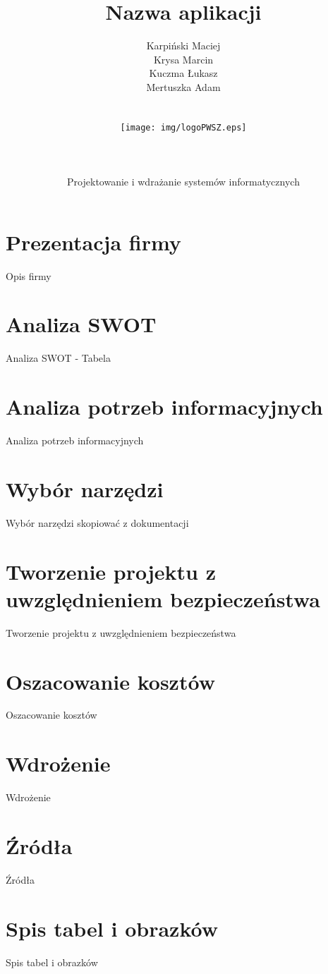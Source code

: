 \documentclass[12pt,a4paper]{article}
\author{Karpiński Maciej\\Krysa Marcin\\Kuczma Łukasz\\Mertuszka Adam\\\\\\\texttt{[image: img/logoPWSZ.eps]}\\\\\\\\Projektowanie i wdrażanie systemów informatycznych}
\title{Nazwa aplikacji}
\begin{document}
	\maketitle
	\thispagestyle{empty}
	\clearpage

	\tableofcontents
	\newpage

	\section{Prezentacja firmy}
		\indent Opis firmy
	\newpage

	\section{Analiza SWOT}
		\indent Analiza SWOT - Tabela
	\newpage
	
	\section{Analiza potrzeb informacyjnych}
		\indent Analiza potrzeb informacyjnych
	\newpage
	
	\section{Wybór narzędzi}
		\indent Wybór narzędzi skopiować z dokumentacji
	\newpage
	
	\section{Tworzenie projektu z uwzględnieniem bezpieczeństwa}
		\indent Tworzenie projektu z uwzględnieniem bezpieczeństwa
	\newpage
	
	\section{Oszacowanie kosztów}
		\indent Oszacowanie kosztów
	\newpage
	
	\section{Wdrożenie}
		\indent Wdrożenie
	\newpage
	
	\section{Źródła}
		\indent Źródła
	\newpage
	
	\section{Spis tabel i obrazków}
		\indent Spis tabel i obrazków
	\newpage
\end{document}
